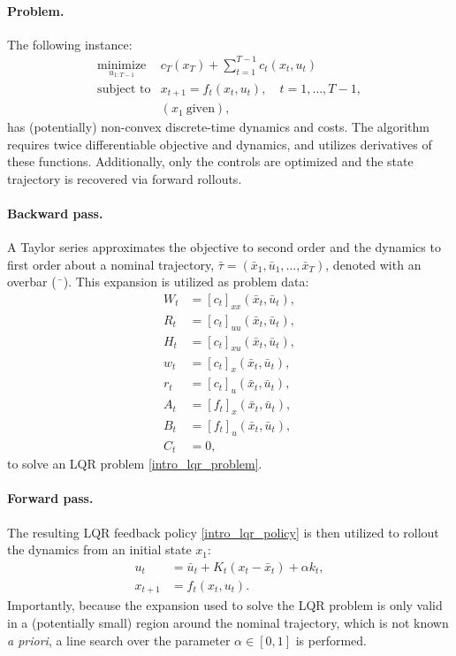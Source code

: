 \paragraph{Problem.}
The following instance:
\begin{equation}
	\begin{array}{ll}
		\underset{u_{1:T-1}}{\mbox{minimize}} & c_T(x_T) + \sum \limits_{t = 1}^{T-1} c_t(x_t, u_t) \label{intro_ddp}\\
		\mbox{subject to} & x_{t+1} = f_t(x_t,u_t), \quad t = 1,\dots,T-1,\\
		& (x_1~\mbox{given}),
	\end{array}
\end{equation}
has (potentially) non-convex discrete-time dynamics and costs. The algorithm requires twice differentiable objective and dynamics, and utilizes derivatives of these functions. Additionally, only the controls are optimized and the state trajectory is recovered via forward rollouts.

\paragraph{Backward pass.}
A Taylor series approximates the objective to second order and the dynamics to first order about a nominal trajectory, $\bar{\tau} = (\bar{x}_1, \bar{u}_1, \dots, \bar{x}_T)$, denoted with an overbar ($\bar{\phantom{x}}$). This expansion is utilized as problem data: 
\begin{align}
	W_t &= [c_t]_{xx}(\bar{x}_t, \bar{u}_t), \\
	R_t &= [c_t]_{uu}(\bar{x}_t, \bar{u}_t), \\
	H_t &= [c_t]_{xu}(\bar{x}_t, \bar{u}_t), \\
	w_t &= [c_t]_{x}(\bar{x}_t, \bar{u}_t), \\
	r_t &= [c_t]_{u}(\bar{x}_t, \bar{u}_t), \\
	A_t &= [f_t]_{x}(\bar{x}_t, \bar{u}_t), \\
	B_t &= [f_t]_{u}(\bar{x}_t, \bar{u}_t), \\
	C_t &= 0,
\end{align}
to solve an LQR problem \eqref{intro_lqr_problem}.  

\paragraph{Forward pass.}
The resulting LQR feedback policy \eqref{intro_lqr_policy} is then utilized to rollout the dynamics from an initial state $x_1$: 
\begin{align}
	u_t &= \bar{u}_t + K_t (x_t - \bar{x}_t) + \alpha k_t, \\
	x_{t+1} &= f_t(x_t, u_t).
\end{align}
Importantly, because the expansion used to solve the LQR problem is only valid in a (potentially small) region around the nominal trajectory, which is not known \textit{a priori}, a line search over the parameter $\alpha \in [0, 1]$ is performed.

